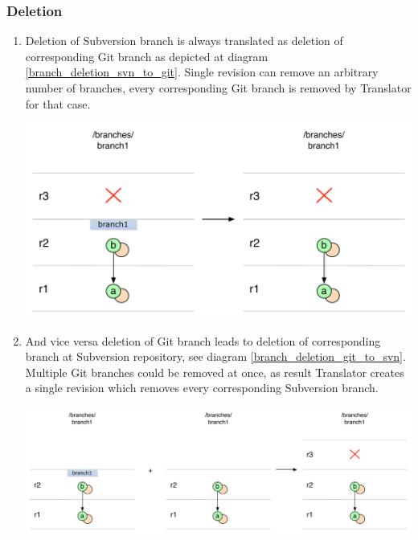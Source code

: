 \subsubsection{Deletion}

\begin{enumerate}
\compactlist

\item Deletion of Subversion branch is always translated as deletion of corresponding Git branch as depicted at diagram \ref{branch_deletion_svn_to_git}. Single revision can remove an arbitrary number of branches, every corresponding Git branch is removed by Translator for that case.
\begin{center}
\includegraphics[width=\linewidth]{img/diagrams/branch_deletion_svn_to_git.pdf}%
\label{branch_deletion_svn_to_git}%
\end{center}

\item And vice versa deletion of Git branch leads to deletion of corresponding branch at Subversion repository, see diagram \ref{branch_deletion_git_to_svn}. Multiple Git branches could be removed at once, as result Translator creates a single revision which removes every corresponding Subversion branch.
\begin{center}
\includegraphics[width=\linewidth]{img/diagrams/branch_deletion_git_to_svn.pdf}%
\label{branch_deletion_git_to_svn}%
\end{center}

\end{enumerate}


